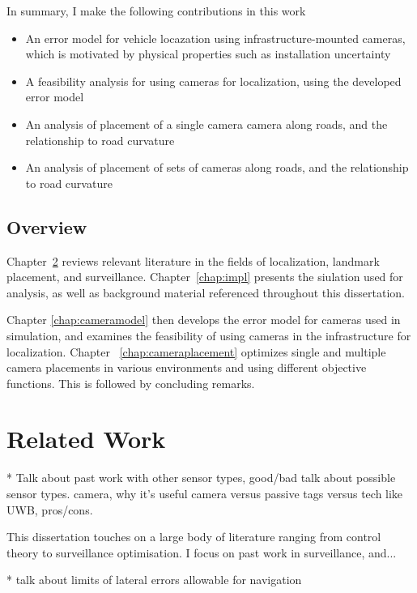 \documentclass[a4paper,12pt,twoside,openright]{report}
\begin{document}
In summary, I make the following contributions in this work
\begin{itemize}
    \item An error model for vehicle locazation using infrastructure-mounted cameras, which is motivated by physical properties such as installation uncertainty
    \item A feasibility analysis for using cameras for localization, using the developed error model
    \item An analysis of placement of a single camera camera along roads, and the relationship to road curvature
    \item An analysis of placement of sets of cameras along roads, and the relationship to road curvature
\end{itemize}



\section{Overview}

Chapter~\ref{chap:relatedwork} reviews relevant literature in the fields of
localization, landmark placement, and surveillance. Chapter~\ref{chap:impl} presents 
the siulation used for analysis, as well as background material referenced throughout 
this dissertation.

Chapter \ref{chap:cameramodel} then develops the error model for cameras
used in simulation, and examines the feasibility of using cameras in the infrastructure for localization.
Chapter ~\ref{chap:cameraplacement} optimizes single and multiple camera placements
in various environments and using different objective functions. This is followed by concluding remarks.

\chapter{Related Work} 
\label{chap:relatedwork}

* Talk about past work with other sensor types, good/bad
talk about possible sensor types. camera, why it's useful
camera versus passive tags versus tech like UWB, pros/cons.

This dissertation touches on a large body of literature ranging from 
control theory to surveillance optimisation. I focus on past work
in surveillance, and... 

* talk about limits of lateral errors allowable for navigation
\end{document}
